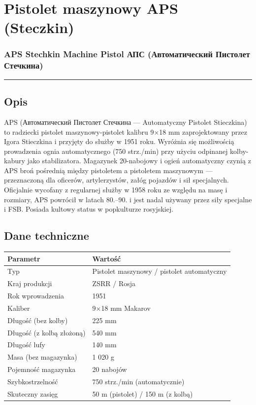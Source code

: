 \documentclass[12pt,openany,oneside]{book}
\begin{document}
\chapter{Pistolet maszynowy APS
(Steczkin)}\label{pistolet-maszynowy-aps-steczkin}

\subsection{APS Stechkin Machine Pistol \textbar{} АПС (Автоматический
Пистолет
Стечкина)}\label{aps-stechkin-machine-pistol-ux430ux43fux441-ux430ux432ux442ux43eux43cux430ux442ux438ux447ux435ux441ux43aux438ux439-ux43fux438ux441ux442ux43eux43bux435ux442-ux441ux442ux435ux447ux43aux438ux43dux430}

\begin{center}\rule{0.5\linewidth}{0.5pt}\end{center}

\section{Opis}\label{opis-88}

APS (Автоматический Пистолет Стечкина --- Automatyczny Pistolet
Stieczkina) to radziecki pistolet maszynowy-pistolet kalibru 9×18 mm
zaprojektowany przez Igora Stieczkina i przyjęty do służby w 1951 roku.
Wyróżnia się możliwością prowadzenia ognia automatycznego (750
strz./min) przy użyciu odpinanej kolby-kabury jako stabilizatora.
Magazynek 20-nabojowy i ogień automatyczny czynią z APS broń pośrednią
między pistoletem a pistoletem maszynowym --- przeznaczoną dla oficerów,
artylerzystów, załóg pojazdów i sił specjalnych. Oficjalnie wycofany z
regularnej służby w 1958 roku ze względu na masę i rozmiary, APS
powrócił w latach 80.--90. i jest nadal używany przez siły specjalne i
FSB. Posiada kultowy status w popkulturze rosyjskiej.

\section{Dane techniczne}\label{dane-techniczne-88}

\begin{longtable}[]{@{}ll@{}}
\toprule\noalign{}
Parametr & Wartość \\
\midrule\noalign{}
\endhead
\bottomrule\noalign{}
\endlastfoot
Typ & Pistolet maszynowy / pistolet automatyczny \\
Kraj produkcji & ZSRR / Rosja \\
Rok wprowadzenia & 1951 \\
Kaliber & 9×18 mm Makarov \\
Długość (bez kolby) & 225 mm \\
Długość (z kolbą złożoną) & 540 mm \\
Długość lufy & 140 mm \\
Masa (bez magazynka) & 1 020 g \\
Pojemność magazynka & 20 nabojów \\
Szybkostrzelność & 750 strz./min (automatycznie) \\
Skuteczny zasięg & 50 m (pistolet) / 150 m (z kolbą) \\
\end{longtable}
\end{document}
